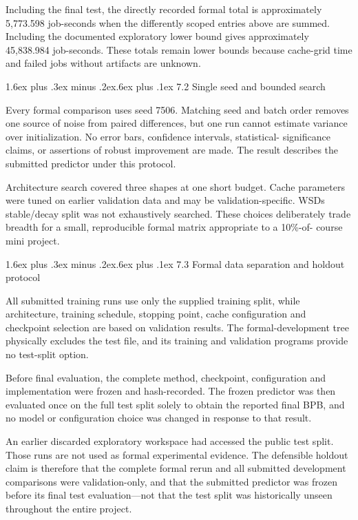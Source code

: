 \documentclass[11pt]{article}
\makeatletter
\renewcommand\subsection{\@startsection{subsection}{2}{0pt}%
  {1.6ex plus .3ex minus .2ex}{.6ex plus .1ex}%
  {\normalfont\normalsize\bfseries}}
\makeatother
\begin{document}
Including the final test, the directly recorded formal total is
approximately 5,773.598 job-seconds when the differently scoped entries
above are summed. Including the documented exploratory lower bound gives
approximately 45,838.984 job-seconds. These totals remain lower bounds
because cache-grid time and failed jobs without artifacts are unknown.

\subsection{7.2 Single seed and bounded
search}\label{72-single-seed-and-bounded-search}

Every formal comparison uses seed 7506. Matching seed and batch order
removes one source of noise from paired differences, but one run cannot
estimate variance over initialization. No error bars, confidence
intervals, statistical- significance claims, or assertions of robust
improvement are made. The result describes the submitted predictor under
this protocol.

Architecture search covered three shapes at one short budget. Cache
parameters were tuned on earlier validation data and may be
validation-specific. WSD\textquotesingle s stable/decay split was not
exhaustively searched. These choices deliberately trade breadth for a
small, reproducible formal matrix appropriate to a 10\%-of- course mini
project.

\subsection{7.3 Formal data separation and holdout
protocol}\label{73-formal-data-separation-and-holdout-protocol}

All submitted training runs use only the supplied training split, while
architecture, training schedule, stopping point, cache configuration and
checkpoint selection are based on validation results. The
formal-development tree physically excludes the test file, and its
training and validation programs provide no test-split option.

Before final evaluation, the complete method, checkpoint, configuration
and implementation were frozen and hash-recorded. The frozen predictor
was then evaluated once on the full test split solely to obtain the
reported final BPB, and no model or configuration choice was changed in
response to that result.

An earlier discarded exploratory workspace had accessed the public test
split. Those runs are not used as formal experimental evidence. The
defensible holdout claim is therefore that the complete formal rerun and
all submitted development comparisons were validation-only, and that the
submitted predictor was frozen before its final test evaluation---not
that the test split was historically unseen throughout the entire
project.
\end{document}
